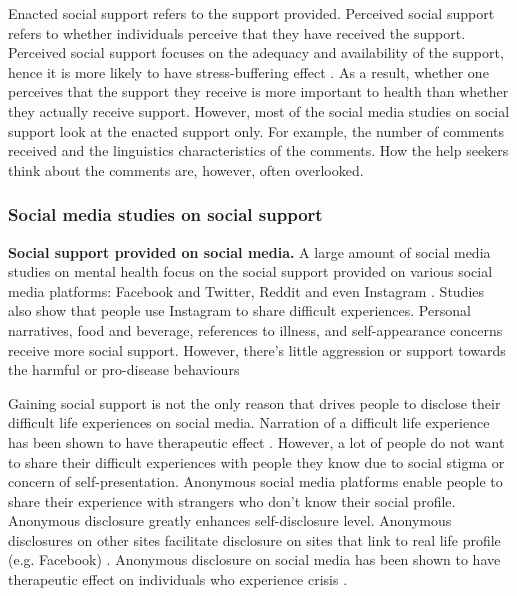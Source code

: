 Enacted social support refers to the support provided. Perceived social support refers to whether individuals perceive that they have received the support. Perceived social support focuses on the adequacy and availability of the support, hence it is more likely to have stress-buffering effect \cite{cohen1984social,cutrona1990type}. As a result, whether one perceives that the support they receive is more important to health than whether they actually receive support. However, most of the social media studies on social support look at the enacted support only. For example, the number of comments received and the linguistics characteristics of the comments. How the help seekers think about the comments are, however, often overlooked.

\subsubsection{Social media studies on social support}
\textbf{Social support provided on social media.} A large amount of social media studies on mental health focus on the social support provided on various social media platforms: Facebook and Twitter\cite{settanni2015sharing}, Reddit \cite{Sharma2018support} and even Instagram \cite{andalibi2017sensitive}. Studies also show that people use Instagram to share difficult experiences. Personal narratives, food and beverage, references to illness, and self-appearance concerns receive more social support. However, there's little aggression or support towards the harmful or pro-disease behaviours \cite{oh2015motivations}

Gaining social support is not the only reason that drives people to disclose their difficult life experiences on social media. Narration of a difficult life experience has been shown to have therapeutic effect \cite{dwivedi2006therapeutic}. However, a lot of people do not want to share their difficult experiences with people they know due to social stigma or concern of self-presentation. Anonymous social media platforms enable people to share their experience with strangers who don't know their social profile. Anonymous disclosure greatly enhances self-disclosure level. Anonymous disclosures on other sites facilitate disclosure on sites that link to real life profile (e.g. Facebook) \cite{andalibi2018announcing}. Anonymous disclosure on social media has been shown to have therapeutic effect on individuals who experience crisis \cite{saha2018social}. 


